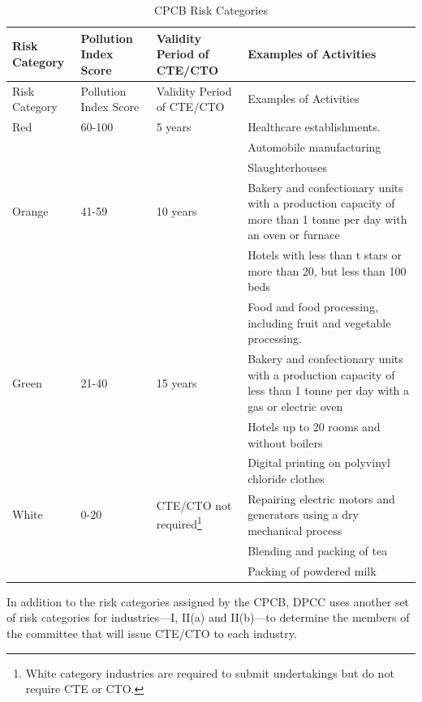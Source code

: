 \documentclass[a4paper, 12pt]{article}
\newcommand\tabitem{\makebox[1em][r]{\textbullet~}}
\begin{document}



\begin{longtable}{p{2cm}>{\raggedright}p{3.5cm}>{\raggedright}p{3.5cm}>{\raggedright\arraybackslash}p{6cm}}
\caption{CPCB Risk Categories} \\
Risk Category & Pollution Index Score & Validity Period of CTE/CTO & Examples of Activities \\
\midrule
\endfirsthead
Risk Category & Pollution Index Score & Validity Period of CTE/CTO & Examples of Activities \\
\midrule
\endhead
\endfoot
\endlastfoot

Red & 60-100 & 5 years & \tabitem Healthcare establishments. \\
 &  &  &   \tabitem Automobile manufacturing \\
  &  &  &  \tabitem Slaughterhouses \\
Orange & 41-59 & 10 years &  \tabitem Bakery and confectionary units with a production capacity of more than 1 tonne per day with an oven or furnace  \\
 &  &  & \tabitem Hotels with less than t stars or more than 20, but less than 100 beds \\
 &  &  & \tabitem Food and food processing, including fruit and vegetable processing.  \\
Green & 21-40 & 15 years & \tabitem Bakery and confectionary units with a production capacity of less than 1 tonne per day with a gas or electric oven \\
 &  &  &  \tabitem Hotels up to 20 rooms and without boilers \\
 &  &  & \tabitem Digital printing on polyvinyl chloride clothes \\
White & 0-20 & CTE/CTO not required\footnote{White category industries are required to submit undertakings but do not require CTE or CTO.} & \tabitem Repairing electric motors and generators using a dry mechanical process \\
 &  &  & \tabitem Blending and packing of tea \\
 &  &  & \tabitem Packing of powdered milk \\

\end{longtable}

                                  
                 In addition to the risk categories assigned by the CPCB, DPCC uses another set of risk categories for industries—I, II(a) and II(b)—to determine the members of the committee that will issue CTE/CTO to each industry.\\
                 
\end{document}
